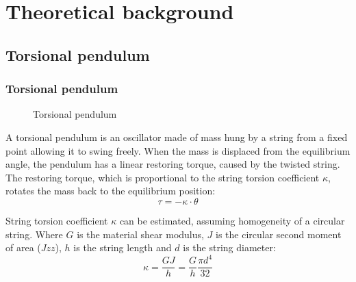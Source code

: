 \documentclass[\main/master.tex]{subfiles}
\begin{document}
\chapter{Theoretical background}\label{chapter:Theoretical background}


\section{Torsional pendulum}
\subsection{Torsional pendulum}
\begin{figure}[htbp]
	\centering
	\caption[Torsional pendulum]{Torsional pendulum}
	\label{fig:torsion_pendulum}
\end{figure}
\par\noindent
A torsional pendulum is an oscillator made of mass hung by a string from a fixed point allowing it to swing freely. When the mass is displaced from the equilibrium angle, the pendulum has a linear restoring torque, caused by the twisted string. The restoring torque, which is proportional to the string torsion coefficient $\kappa$, rotates the mass back to the equilibrium position:
\begin{equation}
\tau = -\kappa\cdot\theta     \label{eqn:undamped_motion_equation}
\end{equation}


\par\noindent
String torsion coefficient $\kappa$ can be estimated, assuming homogeneity of a circular string. Where $G$ is the material shear modulus, $J$ is the circular second moment of area ($Jzz$), $h$ is the string length and $d$ is the string diameter:
\begin{equation}
\kappa = \frac{GJ}{h} = \frac{G}{h} \frac{\pi d^4}{32}    \label{eqn:torsion_coefficient}
\end{equation}

 
\end{document}
